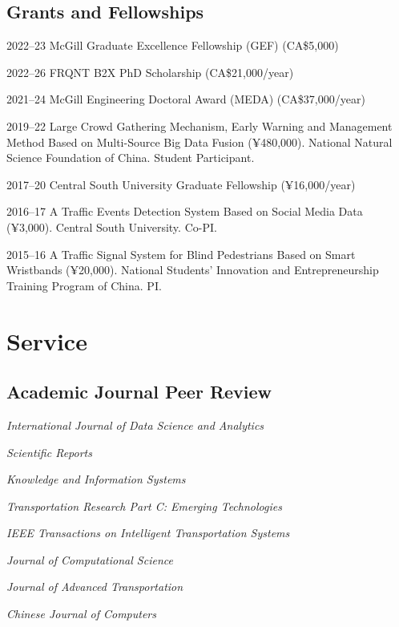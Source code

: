 \documentclass[12pt,letterpaper]{report}
\newcommand{\listitemspace}{0.25em}
\renewenvironment{itemize}
{\begin{list}{}{\setlength{\leftmargin}{0em}
                \setlength{\parskip}{0em}
                \setlength{\itemsep}{\listitemspace}
                \setlength{\parsep}{\listitemspace}}}
{\end{list}}
\begin{document}
    \subsection*{Grants and Fellowships}
    \begin{tablist}
        \item[2022--23] \tab McGill Graduate Excellence Fellowship (GEF) (CA\$5,000)
        \item[2022--26] \tab FRQNT B2X PhD Scholarship (CA\$21,000/year)
        \item[2021--24] \tab McGill Engineering Doctoral Award (MEDA) (CA\$37,000/year)
        \item[2019--22] \tab Large Crowd Gathering Mechanism, Early Warning and Management Method Based on Multi-Source Big Data Fusion (¥480,000). National Natural Science Foundation of China. Student Participant.
        \item[2017--20] \tab Central South University Graduate Fellowship (¥16,000/year)
        \item[2016--17] \tab A Traffic Events Detection System Based on Social Media Data (¥3,000). Central South University. Co-PI.
        \item[2015--16] \tab A Traffic Signal System for Blind Pedestrians Based on Smart Wristbands (¥20,000). National Students’ Innovation and Entrepreneurship Training Program of China. PI.
    \end{tablist}

    \section*{Service}
    \subsection*{Academic Journal Peer Review}
    \begin{itemize}
        \item \textit{International Journal of Data Science and Analytics}
        \item \textit{Scientific Reports}
        \item \textit{Knowledge and Information Systems}
        \item \textit{Transportation Research Part C: Emerging Technologies}
        \item \textit{IEEE Transactions on Intelligent Transportation Systems}
        \item \textit{Journal of Computational Science}
        \item \textit{Journal of Advanced Transportation}
        \item \textit{Chinese Journal of Computers}
    \end{itemize}
\end{document}
